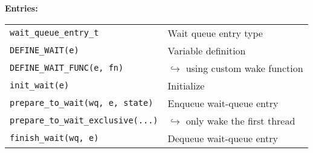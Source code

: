 \begin{header}
\textbf{Entries:}
\begin{tabularx}{\linewidth}{@{}lX@{}}
\texttt{wait\_queue\_entry\_t} & Wait queue entry type \\
\texttt{DEFINE\_WAIT(e)} & Variable definition \\
\texttt{DEFINE\_WAIT\_FUNC(e, fn)} & $\hookrightarrow$ using custom wake function \\
\texttt{init\_wait(e)} & Initialize \\
\hline
\texttt{prepare\_to\_wait(wq, e, state)} & Enqueue wait-queue entry \\
\texttt{prepare\_to\_wait\_exclusive(...)} & $\hookrightarrow$ only wake the first thread \\
\texttt{finish\_wait(wq, e)} & Dequeue wait-queue entry \\
\end{tabularx}
\end{header}
